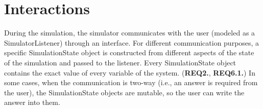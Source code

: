 \section{Interactions}\label{sec:interactions}

During the simulation, the simulator communicates with the user (modeled as a \textsf{SimulatorListener}) through an interface. For different communication purposes, a specific \textsf{SimulationState} object is constructed from different aspects of the state of the simulation and passed to the listener. Every \textsf{SimulationState} object contains the exact value of every variable of the system. (\textbf{REQ2.}, \textbf{REQ6.1.}) In some cases, when the communication is two-way (i.e., an answer is required from the user), the \textsf{SimulationState} objects are mutable, so the user can write the answer into them.

